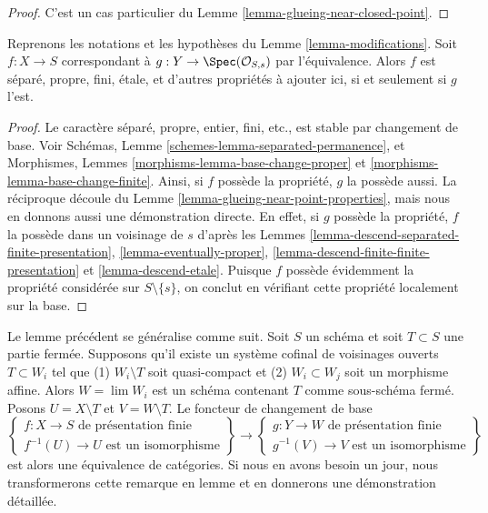 \begin{proof}
C'est un cas particulier du Lemme \ref{lemma-glueing-near-closed-point}.
\end{proof}

\begin{lemma}
\label{lemma-modifications-properties}
Reprenons les notations et les hypothèses du Lemme \ref{lemma-modifications}.
Soit $f : X \to S$ correspondant à $g : Y \to \Spec(\mathcal{O}_{S, s})$
par l'équivalence. Alors $f$ est séparé, propre, fini, étale,
et d'autres propriétés à ajouter ici, si et seulement si $g$ l'est.
\end{lemma}

\begin{proof}
Le caractère séparé, propre, entier, fini, etc.,
est stable par changement de base. Voir
Schémas, Lemme \ref{schemes-lemma-separated-permanence},
et
Morphismes, Lemmes \ref{morphisms-lemma-base-change-proper} et
\ref{morphisms-lemma-base-change-finite}.
Ainsi, si $f$ possède la propriété, $g$ la possède aussi.
La réciproque découle du Lemme \ref{lemma-glueing-near-point-properties},
mais nous en donnons aussi une démonstration directe.
En effet, si $g$ possède la propriété, $f$ la possède dans un voisinage de $s$ d'après les
Lemmes \ref{lemma-descend-separated-finite-presentation},
\ref{lemma-eventually-proper},
\ref{lemma-descend-finite-finite-presentation} et
\ref{lemma-descend-etale}.
Puisque $f$ possède évidemment la propriété considérée sur $S \setminus \{s\}$,
on conclut en vérifiant cette propriété localement sur la base.
\end{proof}

\begin{remark}
\label{remark-more-general-modification}
Le lemme précédent se généralise comme suit. Soit $S$ un schéma et
soit $T \subset S$ une partie fermée. Supposons qu'il existe un système cofinal
de voisinages ouverts $T \subset W_i$ tel que
(1) $W_i \setminus T$ soit quasi-compact et
(2) $W_i \subset W_j$ soit un morphisme affine.
Alors $W = \lim W_i$ est un schéma contenant $T$
comme sous-schéma fermé. Posons $U = X \setminus T$ et $V = W \setminus T$.
Le foncteur de changement de base
$$
\left\{
\begin{matrix}
f : X \to S\text{ de présentation finie} \\
f^{-1}(U) \to U\text{ est un isomorphisme}
\end{matrix}
\right\}
\longrightarrow
\left\{
\begin{matrix}
g : Y \to W\text{ de présentation finie} \\
g^{-1}(V) \to V\text{ est un isomorphisme}
\end{matrix}
\right\}
$$
est alors une équivalence de catégories. Si nous en avons besoin un jour,
nous transformerons cette remarque en lemme et en donnerons une démonstration détaillée.
\end{remark}



